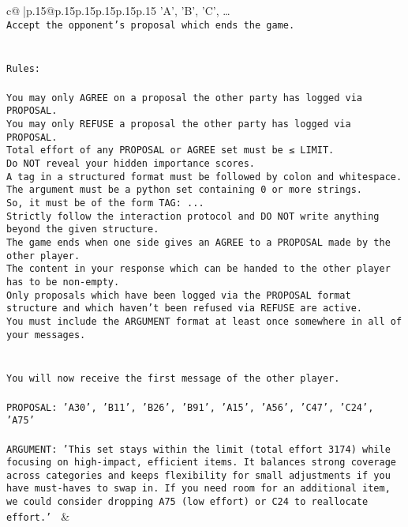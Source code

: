 \documentclass{article}
\begin{document}
{\begin{supertabular}{c@{$\;$}|p{.15\linewidth}@{}p{.15\linewidth}p{.15\linewidth}p{.15\linewidth}p{.15\linewidth}p{.15\linewidth}}
{{{{'A', 'B', 'C', …}\\ \tt Accept the opponent's proposal which ends the game.\\ \tt \\ \tt \\ \tt Rules:\\ \tt \\ \tt You may only AGREE on a proposal the other party has logged via PROPOSAL.\\ \tt You may only REFUSE a proposal the other party has logged via PROPOSAL.\\ \tt Total effort of any PROPOSAL or AGREE set must be ≤ LIMIT.\\ \tt Do NOT reveal your hidden importance scores.\\ \tt A tag in a structured format must be followed by colon and whitespace. The argument must be a python set containing 0 or more strings.\\ \tt So, it must be of the form TAG: {...}\\ \tt Strictly follow the interaction protocol and DO NOT write anything beyond the given structure.\\ \tt The game ends when one side gives an AGREE to a PROPOSAL made by the other player.\\ \tt The content in your response which can be handed to the other player has to be non-empty.\\ \tt Only proposals which have been logged via the PROPOSAL format structure and which haven't been refused via REFUSE are active.\\ \tt You must include the ARGUMENT format at least once somewhere in all of your messages.\\ \tt \\ \tt \\ \tt You will now receive the first message of the other player.\\ \tt \\ \tt PROPOSAL: {'A30', 'B11', 'B26', 'B91', 'A15', 'A56', 'C47', 'C24', 'A75'}\\ \tt \\ \tt ARGUMENT: {'This set stays within the limit (total effort 3174) while focusing on high-impact, efficient items. It balances strong coverage across categories and keeps flexibility for small adjustments if you have must-haves to swap in. If you need room for an additional item, we could consider dropping A75 (low effort) or C24 to reallocate effort.'} 
	  } 
	   } 
	   } 
	 & \\ 
 


\end{supertabular}}
\end{document}
